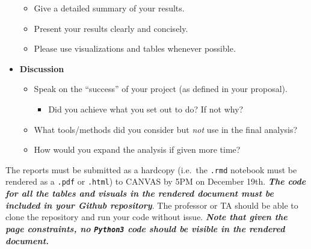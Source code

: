 \documentclass[
  12pt,
]{article}
\providecommand{\tightlist}{%
  \setlength{\itemsep}{0pt}\setlength{\parskip}{0pt}}
\begin{document}
\begin{itemize}
  \begin{itemize}
  \item
    Give a detailed summary of your results.
  \item
    Present your results clearly and concisely.
  \item
    Please use visualizations and tables whenever possible.
  \end{itemize}
\item
  \textbf{Discussion}

  \begin{itemize}
  \item
    Speak on the ``success'' of your project (as defined in your
    proposal).

    \begin{itemize}
    \tightlist
    \item
      Did you achieve what you set out to do? If not why?
    \end{itemize}
  \item
    What tools/methods did you consider but \emph{not} use in the final
    analysis?
  \item
    How would you expand the analysis if given more time?
  \end{itemize}
\end{itemize}

The reports must be submitted as a hardcopy (i.e.~the \texttt{.rmd}
notebook must be rendered as a \texttt{.pdf} or \texttt{.html}) to
CANVAS by 5PM on December 19th. \textbf{\emph{The code for all the
tables and visuals in the rendered document must be included in your
Github repository}}. The professor or TA should be able to clone the
repository and run your code without issue. \textbf{\emph{Note that
given the page constraints, no \texttt{Python3} code should be visible
in the rendered document.}}
\end{document}
